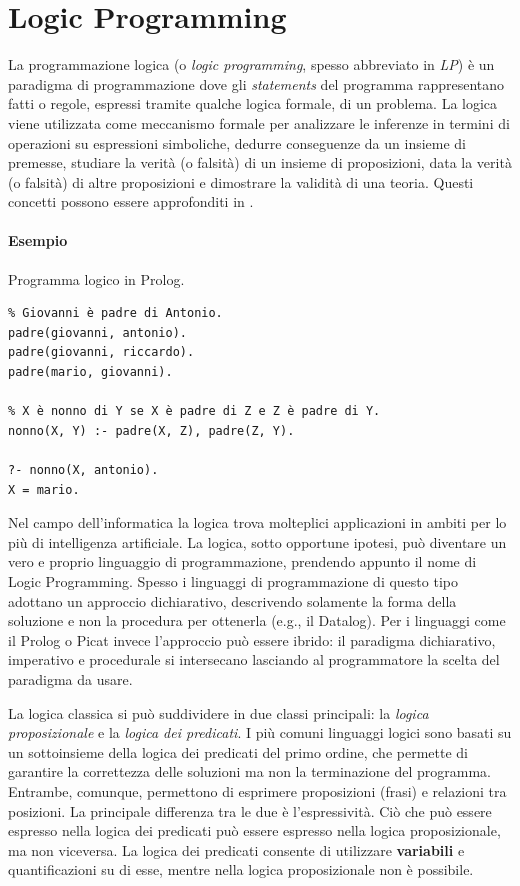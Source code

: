 \documentclass[12pt,a4paper,openright]{book} %
\begin{document}
\section{Logic Programming}
\label{sec:logic_programming}

La programmazione logica (o \emph{logic programming}, spesso abbreviato in \emph{LP}) è un paradigma di programmazione dove gli \emph{statements} del programma rappresentano fatti o regole, espressi tramite qualche logica formale, di un problema. La logica viene utilizzata come meccanismo formale per analizzare le inferenze in termini di operazioni su espressioni simboliche, dedurre conseguenze da un insieme di premesse, studiare la verità (o falsità) di un insieme di proposizioni, data la verità (o falsità) di altre proposizioni e dimostrare la validità di una teoria. Questi concetti possono essere approfonditi in \cite{Console97}.

\paragraph{Esempio}
Programma logico in Prolog.
\begin{verbatim}
% Giovanni è padre di Antonio.
padre(giovanni, antonio).
padre(giovanni, riccardo).
padre(mario, giovanni).

% X è nonno di Y se X è padre di Z e Z è padre di Y.
nonno(X, Y) :- padre(X, Z), padre(Z, Y).

?- nonno(X, antonio).
X = mario.
\end{verbatim}

Nel campo dell'informatica la logica trova molteplici applicazioni in ambiti per lo più di intelligenza artificiale. La logica, sotto opportune ipotesi, può diventare un vero e proprio linguaggio di programmazione, prendendo appunto il nome di Logic Programming. Spesso i linguaggi di programmazione di questo tipo adottano un approccio dichiarativo, descrivendo solamente la forma della soluzione e non la procedura per ottenerla (e.g., il Datalog). Per i linguaggi come il Prolog o Picat invece l'approccio può essere ibrido: il paradigma dichiarativo, imperativo e procedurale si intersecano lasciando al programmatore la scelta del paradigma da usare.

La logica classica si può suddividere in due classi principali: la \emph{logica proposizionale} e la \emph{logica dei predicati}.  I più comuni linguaggi logici sono basati su un sottoinsieme della logica dei predicati del primo ordine, che permette di garantire la correttezza delle soluzioni ma non la terminazione del programma. Entrambe, comunque, permettono di esprimere proposizioni (frasi) e
relazioni tra posizioni. La principale differenza tra le due è l'espressività. Ciò che può essere espresso nella logica dei predicati può essere espresso nella logica proposizionale, ma non viceversa. La logica dei predicati consente di utilizzare \textbf{variabili} e quantificazioni su di esse, mentre nella logica proposizionale non è possibile.
\end{document}
